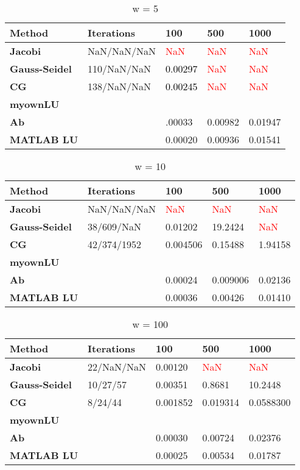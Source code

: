 \documentclass[a4paper]{article}
\begin{document}
\begin{table}[ht!]
\centering
\begin{tabular}{lllll}
\textbf{Method}& \textbf{Iterations}& \textbf{100}& \textbf{500}& \textbf{1000} \\ \hline
\textbf{Jacobi}& NaN/NaN/NaN& \textcolor{red}{NaN}& \textcolor{red}{NaN}& \textcolor{red}{NaN} \\ 
\textbf{Gauss-Seidel}& 110/NaN/NaN& \textcolor{black}{0.00297}& \textcolor{red}{NaN}& \textcolor{red}{NaN}\\
\textbf{CG} &138/NaN/NaN & \textcolor{black}{0.00245}& \textcolor{red}{NaN}&  \textcolor{red}{NaN}\\
\textbf{myownLU}& & & & \\ 
\textbf{Ab}& & .00033& 0.00982& 0.01947\\
\textbf{MATLAB LU}& & 0.00020& 0.00936& 0.01541\\
 \hline

\end{tabular}
\caption{w = 5}
\label{tab:tab2}
\end{table}


\begin{table}[ht!]
\centering
\begin{tabular}{lllll}
\textbf{Method}& \textbf{Iterations}& \textbf{100}& \textbf{500}& \textbf{1000} \\ \hline
\textbf{Jacobi}& NaN/NaN/NaN& \textcolor{red}{NaN}& \textcolor{red}{NaN}& \textcolor{red}{NaN}\\ 
\textbf{Gauss-Seidel}& 38/609/NaN& 0.01202& 19.2424& \textcolor{red}{NaN}\\
\textbf{CG} & 42/374/1952& 0.004506& 0.15488&  1.94158\\
\textbf{myownLU}& & & & \\ 
\textbf{Ab}& & 0.00024& 0.009006& 0.02136\\
\textbf{MATLAB LU}& & 0.00036& 0.00426& 0.01410 \\
 \hline

\end{tabular}
\caption{w = 10}
\label{tab:tab3}
\end{table}


\begin{table}[ht!]
\centering
\begin{tabular}{lllll}
\textbf{Method}& \textbf{Iterations}& \textbf{100}& \textbf{500}& \textbf{1000} \\ \hline
\textbf{Jacobi}& 22/NaN/NaN& 0.00120 & \textcolor{red}{NaN} & \textcolor{red}{NaN} \\ 
\textbf{Gauss-Seidel}& 10/27/57& 0.00351 & 0.8681 & 10.2448\\
\textbf{CG} & 8/24/44 & 0.001852& 0.019314&  0.0588300\\
\textbf{myownLU}& & & & \\ 
\textbf{Ab}& & 0.00030& 0.00724& 0.02376\\
\textbf{MATLAB LU}& & 0.00025& 0.00534& 0.01787\\
 \hline

\end{tabular}
\caption{w = 100}
\label{tab:tab3}
\end{table}
\end{document}
